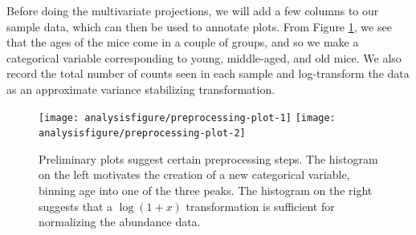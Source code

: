 Before doing the multivariate projections, we will add a few columns
to our sample data, which can then be used to annotate plots. From
Figure \ref{fig:preprocessing-setup}, we see that the ages of the mice
come in a couple of groups, and so we make a categorical variable
corresponding to young, middle-aged, and old mice. We also record the
total number of counts seen in each sample and log-transform the data
as an approximate variance stabilizing transformation.


\begin{figure}[H]
\begin{knitrout}
\color{fgcolor}\begin{kframe}
\begin{alltt}
\hlstd{(}\hlopt{$}  \hlstd{=} \hlstd{)} \hlopt{+} \hlstd{(}\hlstd{)}
\hlstd{(}\hlstd{(}\hlstd{(} \hlopt{+}
  \hlstd{(}\hlstd{)}
\end{alltt}
\end{kframe}

{\centering \texttt{[image: analysisfigure/preprocessing-plot-1]} 
\texttt{[image: analysisfigure/preprocessing-plot-2]} 

}



\end{knitrout}
\caption{Preliminary plots suggest certain preprocessing steps. The
  histogram on the left motivates the creation of a new categorical
  variable, binning age into one of the three peaks. The histogram on
  the right suggests that a $\log\left(1 + x\right)$ transformation is
  sufficient for normalizing the abundance data.}
\label{fig:preprocessing-setup}
\end{figure}

